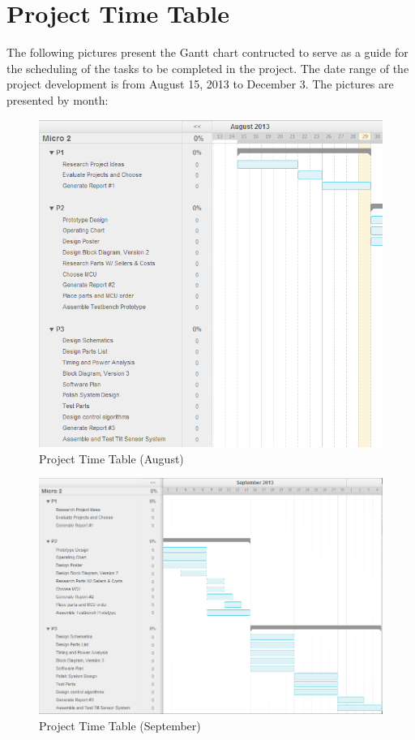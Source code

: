 \section{Project Time Table}
	
	The following pictures present the Gantt chart contructed to serve as a guide for the scheduling of the tasks to be completed in the project. The date range of the project development is from August 15, 2013 to December 3. The pictures are presented by month:

	\begin{figure}[H]
		\centering
			\includegraphics[scale=0.60]{img/ptt-1}
		\caption{Project Time Table (August)}
	\end{figure}

	\begin{figure}[H]
		\centering
			\includegraphics[scale=0.60]{img/ptt-2}
		\caption{Project Time Table (September)}
	\end{figure}

